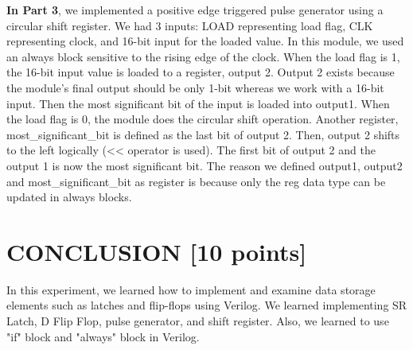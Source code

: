 \documentclass[pdftex,12pt,a4paper]{article}
\begin{document}
\textbf{In Part 3}, we implemented a positive edge triggered pulse generator using a circular shift register. We had 3 inputs: LOAD representing load flag, CLK representing clock, and 16-bit input for the loaded value. In this module, we used an always block sensitive to the rising edge of the clock. When the load flag is 1, the 16-bit input value is loaded to a register, output 2. Output 2 exists because the module’s final output should be only 1-bit whereas we work with a 16-bit input. Then the most significant bit of the input is loaded into output1. When the load flag is 0, the module does the circular shift operation. Another register, most\_significant\_bit is defined as the last bit of output 2. Then, output 2 shifts to the left logically (<< operator is used). The first bit of output 2 and the output 1 is now the most significant bit. The reason we defined output1, output2 and most\_significant\_bit as register is because only the reg data type can be updated in always blocks.



\section{CONCLUSION [10 points]}
In this experiment, we learned how to implement and examine data storage elements such as latches and flip-flops using Verilog. We learned implementing SR Latch, D Flip Flop, pulse generator, and shift register.  Also, we learned to use "if" block and "always" block in Verilog.
\end{document}
